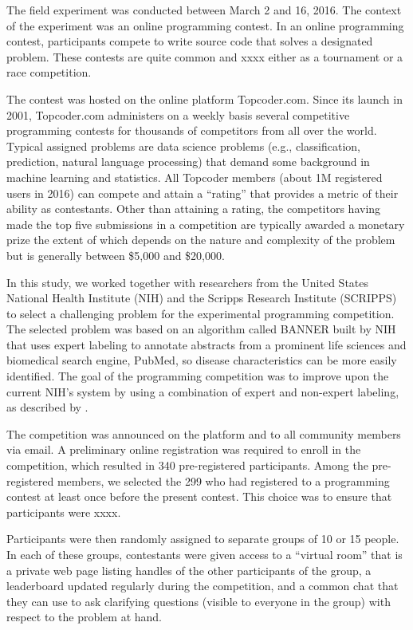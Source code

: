 \documentclass[12pt,]{article}
\begin{document}
The field experiment was conducted between March 2 and 16, 2016. The
context of the experiment was an online programming contest. In an
online programming contest, participants compete to write source code
that solves a designated problem. These contests are quite common and
xxxx either as a tournament or a race competition.

The contest was hosted on the online platform Topcoder.com. Since its
launch in 2001, Topcoder.com administers on a weekly basis several
competitive programming contests for thousands of competitors from all
over the world. Typical assigned problems are data science problems
(e.g., classification, prediction, natural language processing) that
demand some background in machine learning and statistics. All Topcoder
members (about 1M registered users in 2016) can compete and attain a
``rating'' that provides a metric of their ability as contestants. Other
than attaining a rating, the competitors having made the top five
submissions in a competition are typically awarded a monetary prize the
extent of which depends on the nature and complexity of the problem but
is generally between \$5,000 and \$20,000.

In this study, we worked together with researchers from the United
States National Health Institute (NIH) and the Scripps Research
Institute (SCRIPPS) to select a challenging problem for the experimental
programming competition. The selected problem was based on an algorithm
called BANNER built by NIH \citep{leaman2008banner} that uses expert
labeling to annotate abstracts from a prominent life sciences and
biomedical search engine, PubMed, so disease characteristics can be more
easily identified. The goal of the programming competition was to
improve upon the current NIH's system by using a combination of expert
and non-expert labeling, as described by \citet{good2014microtask}.

The competition was announced on the platform and to all community
members via email. A preliminary online registration was required to
enroll in the competition, which resulted in 340 pre-registered
participants. Among the pre-registered members, we selected the 299 who
had registered to a programming contest at least once before the present
contest. This choice was to ensure that participants were xxxx.

Participants were then randomly assigned to separate groups of 10 or 15
people. In each of these groups, contestants were given access to a
``virtual room'' that is a private web page listing handles of the other
participants of the group, a leaderboard updated regularly during the
competition, and a common chat that they can use to ask clarifying
questions (visible to everyone in the group) with respect to the problem
at hand.
\end{document}
